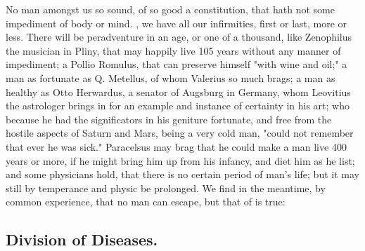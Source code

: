 No man amongst us so sound, of so good a constitution, that hath not some
impediment of body or mind. , we have all our
infirmities, first or last, more or less. There will be peradventure in an age,
or one of a thousand, like Zenophilus the musician in
Pliny, that may happily live 105 years without any manner
of impediment; a Pollio Romulus, that can preserve himself
"with wine and oil;" a man as fortunate as Q. Metellus, of
whom Valerius so much brags; a man as healthy as Otto Herwardus, a senator of
Augsburg in Germany, whom Leovitius the astrologer brings
in for an example and instance of certainty in his art; who because he had the
significators in his geniture fortunate, and free from the hostile aspects of
Saturn and Mars, being a very cold man, "could not remember
that ever he was sick." Paracelsus may brag that he could
make a man live 400 years or more, if he might bring him up from his infancy,
and diet him as he list; and some physicians hold, that there is no certain
period of man's life; but it may still by temperance and physic be prolonged.
We find in the meantime, by common experience, that no man can escape, but that
of \Hesiod{} is true:


\subsection{Division of Diseases.}

